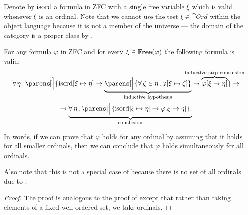 \begin{theorem}\label{thm:transfinite_induction}
  Denote by \( \operatorname{isord} \) a formula in \hyperref[def:zfc]{ZFC} with a single free variable \( \xi \) which is valid whenever \( \xi \) is an ordinal. Note that we cannot use the test \( \xi \in \cat{Ord} \) within the object language because it is not a member of the universe --- the domain of the category is a proper class by .

  For any formula \( \varphi \) in ZFC and for every \( \xi \in \operatorname{\mathbf{Free}}(\varphi) \) the following formula is valid:
  \begin{multline}\label{eq:def:transfinite_induction}
    \qforall \eta \parens[\Big]
      {
        \op{isord}[\xi \mapsto \eta] \rightarrow
          \underbrace
            {
              \parens[\Big] { \qforall {\zeta \in \eta} \varphi[\xi \mapsto \zeta] }
            }_{\T{inductive hypothesis}}
        \rightarrow
        \overbrace{ \varphi[\xi \mapsto \eta] }^{\mathclap{\T{inductive step conclusion}}}
      }
    \rightarrow \\ \rightarrow
    \underbrace
      {
        \qforall \eta \parens[\Big] { \op{isord}[\xi \mapsto \eta] \rightarrow \varphi[\xi \mapsto \eta] }.
      }_{\T{conclusion}}
  \end{multline}

  In words, if we can prove that \( \varphi \) holds for any ordinal by assuming that it holds for all smaller ordinals, then we can conclude that \( \varphi \) holds simultaneously for all ordinals.

  Also note that this is not a special case of  because there is no set of all ordinals due to .
\end{theorem}
\begin{proof}
  The proof is analogous to the proof of  except that rather than taking elements of a fixed well-ordered set, we take ordinals.
\end{proof}

